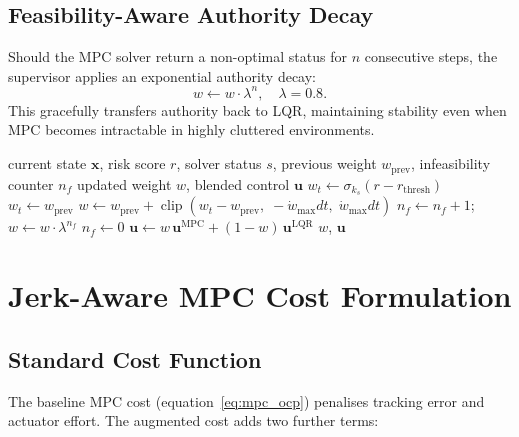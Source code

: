 \documentclass[12pt,a4paper,oneside]{report}
\begin{document}
\section{Feasibility-Aware Authority Decay}

Should the MPC solver return a non-optimal status for \(n\) consecutive
steps, the supervisor applies an exponential authority decay:
\begin{equation}\label{eq:decay}
  w \leftarrow w\cdot\lambda^n,\quad \lambda=0.8.
\end{equation}
This gracefully transfers authority back to LQR, maintaining stability
even when MPC becomes intractable in highly cluttered environments.

\begin{algorithm}
\caption{\texttt{BlendingSupervisor.update()} — online weight update}
\begin{algorithmic}[1]
\Require current state \(\mathbf{x}\), risk score \(r\),
         solver status \(s\), previous weight \(w_{\mathrm{prev}}\),
         infeasibility counter \(n_f\)
\Ensure  updated weight \(w\), blended control \(\mathbf{u}\)
\State \(w_t \gets \sigma_{k_s}(r - r_{\mathrm{thresh}})\)
  \State \(w_t \gets w_{\mathrm{prev}}\)  
\EndIf
\State \(w \gets w_{\mathrm{prev}} +
  \operatorname{clip}(w_t - w_{\mathrm{prev}},\;-\dot{w}_{\max}dt,\;\dot{w}_{\max}dt)\)
  \State \(n_f \gets n_f+1\);\quad \(w \gets w\cdot\lambda^{n_f}\)
\Else
  \State \(n_f \gets 0\)
\EndIf
\State \(\mathbf{u} \gets w\,\mathbf{u}^{\mathrm{MPC}} + (1-w)\,\mathbf{u}^{\mathrm{LQR}}\)
\Return \(w\), \(\mathbf{u}\)
\end{algorithmic}
\end{algorithm}

\chapter{Jerk-Aware MPC Cost Formulation}\label{ch:jerk}

\section{Standard Cost Function}

The baseline MPC cost (equation~\ref{eq:mpc_ocp}) penalises tracking error
and actuator effort. The augmented cost adds two further terms:
\end{document}
